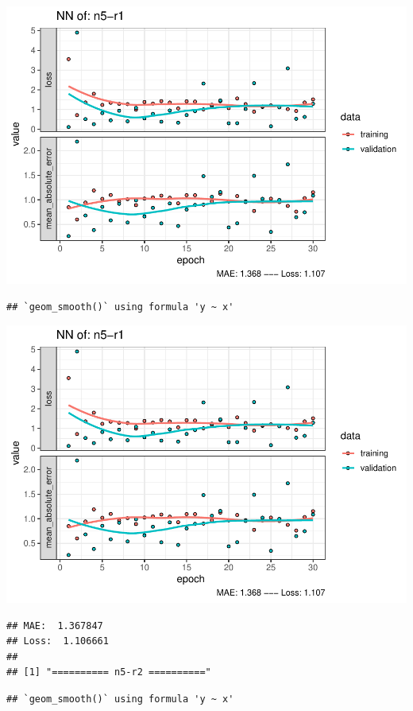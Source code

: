 \documentclass[
]{article}
\begin{document}
\includegraphics{project-code_files/figure-latex/unnamed-chunk-18-35.pdf}

\begin{verbatim}
## `geom_smooth()` using formula 'y ~ x'
\end{verbatim}

\includegraphics{project-code_files/figure-latex/unnamed-chunk-18-36.pdf}

\begin{verbatim}
## MAE:  1.367847
## Loss:  1.106661 
## 
## [1] "========== n5-r2 =========="
\end{verbatim}

\begin{verbatim}
## `geom_smooth()` using formula 'y ~ x'
\end{verbatim}
\end{document}

